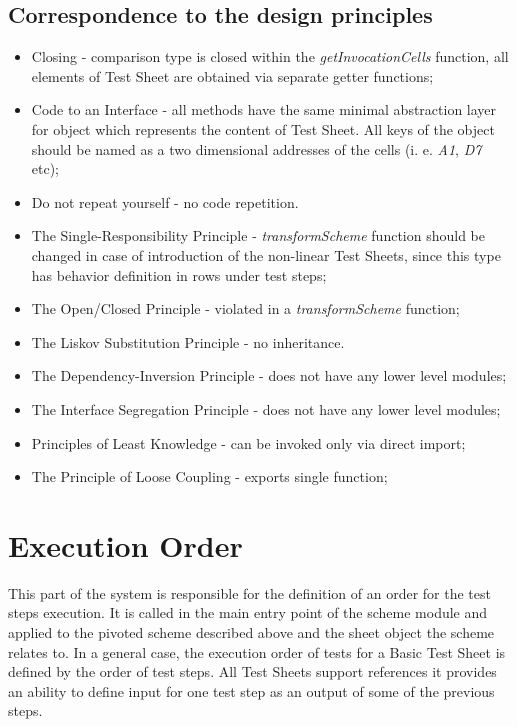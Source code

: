 \subsection{Correspondence to the  design principles}
\begin{itemize}
	\item Closing - comparison type is closed within the \textit{getInvocationCells} function, all elements of Test Sheet are obtained via separate getter functions;
	\item Code to an Interface - all methods have the same minimal abstraction layer for object which represents the content of Test Sheet. All keys of the object should be named as a two dimensional addresses of the cells (i. e. \textit{A1}, \textit{D7} etc);
	\item Do not repeat yourself - no code repetition.
	\item The Single-Responsibility Principle - \textit{transformScheme} function should be changed in case of introduction of the non-linear Test Sheets, since this type has behavior definition in rows under test steps;
	\item The Open/Closed Principle - violated in a \textit{transformScheme} function;
	\item The Liskov Substitution Principle - no inheritance.
	\item The Dependency-Inversion Principle - does not have any lower level modules;
	\item The Interface Segregation Principle - does not have any lower level modules;
	\item Principles of Least Knowledge - can be invoked only via direct import;
	\item The Principle of Loose Coupling - exports single function;
\end{itemize}

\section{Execution Order}
\label{sec:execOrder}
This part of the system is responsible for the definition of an order for the test steps execution. It is called in the main entry point of the scheme module and applied to the pivoted scheme described above and the sheet object the scheme relates to. In a general case, the execution order of tests for a Basic Test Sheet is defined by the order of test steps.
All Test Sheets support references it provides an ability to define input for one test step as an output of some of the previous steps.


